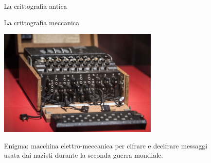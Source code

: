 \documentclass[handout, xcolor=dvipsnames,aspectratio=169]{beamer}
\begin{document}
\begin{frame}{La crittografia antica}
    
  \pause

  \begin{figure}%
    \centering
  \pause
    \qquad
  \end{figure}


\end{frame}

\begin{frame}{La crittografia meccanica}

  \centering
  
    \includegraphics[width=0.6\textwidth]{img/enigma}

  Enigma: macchina elettro-meccanica per cifrare e decifrare messaggi\\ usata dai nazisti durante la seconda guerra mondiale.

\end{frame}
\end{document}
